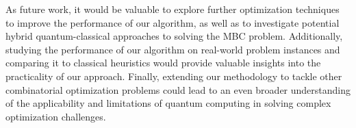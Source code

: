 As future work, it would be valuable to explore further optimization techniques to improve the performance of our algorithm, as well as to investigate potential hybrid quantum-classical approaches to solving the MBC problem. Additionally, studying the performance of our algorithm on real-world problem instances and comparing it to classical heuristics would provide valuable insights into the practicality of our approach. Finally, extending our methodology to tackle other combinatorial optimization problems could lead to an even broader understanding of the applicability and limitations of quantum computing in solving complex optimization challenges.

